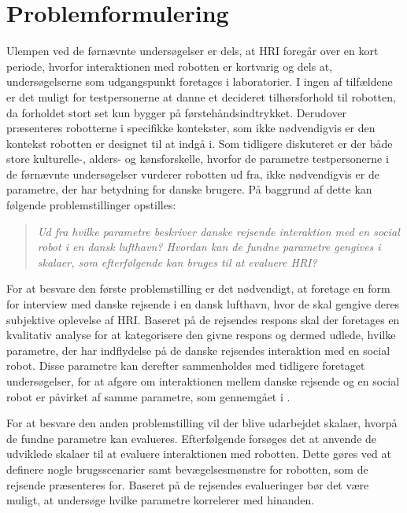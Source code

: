 \section{Problemformulering}
\label{Problemformulering}
%
Ulempen ved de førnævnte undersøgelser er dels, at HRI foregår over en kort periode, hvorfor interaktionen med robotten er kortvarig og dels at, undersøgelserne som udgangspunkt foretages i laboratorier. I ingen af tilfældene er det muligt for testpersonerne at danne et decideret tilhørsforhold til robotten, da forholdet stort set kun bygger på førstehåndsindtrykket. Derudover præsenteres robotterne i specifikke kontekster, som ikke nødvendigvis er den kontekst robotten er designet til at indgå i. Som tidligere diskuteret er der både store kulturelle-, alders- og kønsforskelle, hvorfor de parametre testpersonerne i de førnævnte undersøgelser vurderer robotten ud fra, ikke nødvendigvis er de parametre, der har betydning for danske brugere. På baggrund af dette kan følgende problemstillinger opstilles:\blankline
%
\begin{quotation}
	\noindent
	\textit{Ud fra hvilke parametre beskriver danske rejsende interaktion med en social robot i en dansk lufthavn?\blankline
		Hvordan kan de fundne parametre gengives i skalaer, som efterfølgende kan bruges til at evaluere HRI?}\blankline
\end{quotation}
%
For at besvare den første problemstilling er det nødvendigt, at foretage en form for interview med danske rejsende i en dansk lufthavn, hvor de skal gengive deres subjektive oplevelse af HRI. Baseret på de rejsendes respons skal der foretages en kvalitativ analyse for at kategorisere den givne respons og dermed udlede, hvilke parametre, der har indflydelse på de danske rejsendes interaktion med en social robot. Disse parametre kan derefter sammenholdes med tidligere foretaget undersøgelser, for at afgøre om interaktionen mellem danske rejsende og en social robot er påvirket af samme parametre, som gennemgået i . 

For at besvare den anden problemstilling vil der blive udarbejdet skalaer, hvorpå de fundne parametre kan evalueres. Efterfølgende forsøges det at anvende de udviklede skalaer til at evaluere interaktionen med robotten. Dette gøres ved at definere nogle brugsscenarier samt bevægelsesmønstre for robotten, som de rejsende præsenteres for. Baseret på de rejsendes evalueringer bør det være muligt, at undersøge hvilke parametre korrelerer med hinanden. 


